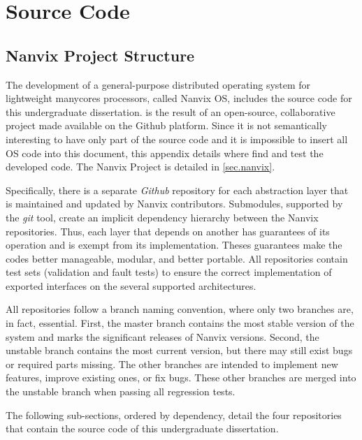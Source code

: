 \chapter{Source Code}
\label{ch:source-code}

\renewcommand{\thefigure}{\thechapter-\arabic{figure}}
\setcounter{figure}{0}

\renewcommand{\thelisting}{\thechapter-\arabic{listing}}
\setcounter{listing}{0}

\section{Nanvix Project Structure}

	The development of a general-purpose distributed operating system for
	lightweight manycores processors, called Nanvix OS, includes the source
	code for this undergraduate dissertation. \nanvixos is the result of an
	open-source, collaborative project made available on the Github platform.
	Since it is not semantically interesting to have only part of the source
	code and it is impossible to insert all OS code into this document, this
	appendix details where find and test the developed code. The Nanvix
	Project is detailed in \autoref{sec.nanvix}.

	Specifically, there is a separate \textit{Github} repository for each abstraction
	layer that is maintained and updated by Nanvix contributors. Submodules,
	supported by the \textit{git} tool, create an implicit dependency hierarchy
	between the Nanvix repositories. Thus, each layer that depends on another
	has guarantees of its operation and is exempt from its implementation.
	Theses guarantees make the codes better manageable, modular, and better
	portable. All repositories contain test sets (validation and fault tests)
	to ensure the correct implementation of exported interfaces on the several
	supported architectures.

	All repositories follow a branch naming convention, where only two
	branches are, in fact, essential. First, the master branch contains
	the most stable version of the system and marks the significant
	releases of Nanvix versions. Second, the unstable branch contains
	the most current version, but there may still exist bugs or required
	parts missing. The other branches are intended to implement new features,
	improve existing ones, or fix bugs. These other branches are merged
	into the unstable branch when passing all regression tests.

	The following sub-sections, ordered by dependency, detail the four
	repositories that contain the source code of this undergraduate dissertation.


